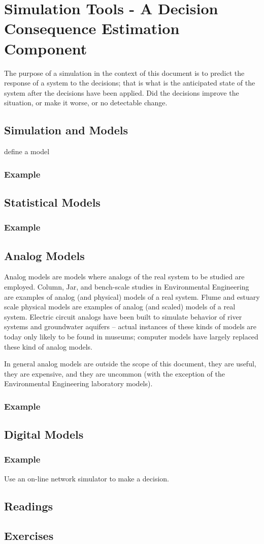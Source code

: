 \section{Simulation Tools - A Decision Consequence Estimation Component}
The purpose of a simulation in the context of this document is to predict the response of a system to the decisions; that is what is the anticipated state of the system after the decisions have been applied.  Did the decisions improve the situation, or make it worse, or no detectable change.
\subsection{Simulation and Models}
define a model



\subsubsection{Example}
\subsection{Statistical Models}
\subsubsection{Example}
\subsection{Analog Models}
Analog models are models where analogs of the real system to be studied are employed.
Column, Jar, and bench-scale studies in Environmental Engineering are examples of analog (and physical) models of a real system.
Flume and estuary  scale physical models are examples of analog (and scaled) models of a real system.
Electric circuit analogs have been built to simulate behavior of river systems and groundwater aquifers -- actual instances of these kinds of models are today only likely to be found in museums; computer models have largely replaced these kind of analog models.

In general analog models are outside the scope of this document, they are useful, they are expensive, and they are uncommon (with the exception of the Environmental Engineering laboratory models).
\subsubsection{Example}
\subsection{Digital Models}
\subsubsection{Example}
Use an on-line network simulator to make a decision.  
\subsection{Readings}
\subsection{Exercises}